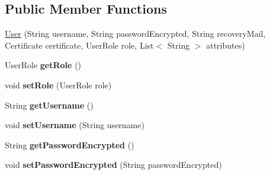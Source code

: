 \subsection*{Public Member Functions}
{\bf }\par
\begin{DoxyCompactItemize}
\item 
\hyperlink{classeu_1_1h2020_1_1symbiote_1_1security_1_1commons_1_1User_af6cce37a5c28aacc648c297a6047df0e}{User} (String username, String password\+Encrypted, String recovery\+Mail, Certificate certificate, User\+Role role, List$<$ String $>$ attributes)
\item 
User\+Role {\bfseries get\+Role} ()\hypertarget{classeu_1_1h2020_1_1symbiote_1_1security_1_1commons_1_1User_aaed5c68b3bcef2910de878bf2e93d9c1}{}\label{classeu_1_1h2020_1_1symbiote_1_1security_1_1commons_1_1User_aaed5c68b3bcef2910de878bf2e93d9c1}

\item 
void {\bfseries set\+Role} (User\+Role role)\hypertarget{classeu_1_1h2020_1_1symbiote_1_1security_1_1commons_1_1User_ae41fe3268e2d879af1cdfe09944e8907}{}\label{classeu_1_1h2020_1_1symbiote_1_1security_1_1commons_1_1User_ae41fe3268e2d879af1cdfe09944e8907}

\item 
String {\bfseries get\+Username} ()\hypertarget{classeu_1_1h2020_1_1symbiote_1_1security_1_1commons_1_1User_ad05ea4cfd2aa34788a522c2f92fecd48}{}\label{classeu_1_1h2020_1_1symbiote_1_1security_1_1commons_1_1User_ad05ea4cfd2aa34788a522c2f92fecd48}

\item 
void {\bfseries set\+Username} (String username)\hypertarget{classeu_1_1h2020_1_1symbiote_1_1security_1_1commons_1_1User_a3431410bd8258116f35cecd3226a9f34}{}\label{classeu_1_1h2020_1_1symbiote_1_1security_1_1commons_1_1User_a3431410bd8258116f35cecd3226a9f34}

\item 
String {\bfseries get\+Password\+Encrypted} ()\hypertarget{classeu_1_1h2020_1_1symbiote_1_1security_1_1commons_1_1User_a7a4b0e7eec06d572c46c01c203f6c0d4}{}\label{classeu_1_1h2020_1_1symbiote_1_1security_1_1commons_1_1User_a7a4b0e7eec06d572c46c01c203f6c0d4}

\item 
void {\bfseries set\+Password\+Encrypted} (String password\+Encrypted)\hypertarget{classeu_1_1h2020_1_1symbiote_1_1security_1_1commons_1_1User_ab8eab93ab78698d3e4a2aceafb633b68}{}\label{classeu_1_1h2020_1_1symbiote_1_1security_1_1commons_1_1User_ab8eab93ab78698d3e4a2aceafb633b68}


\end{DoxyCompactItemize}
